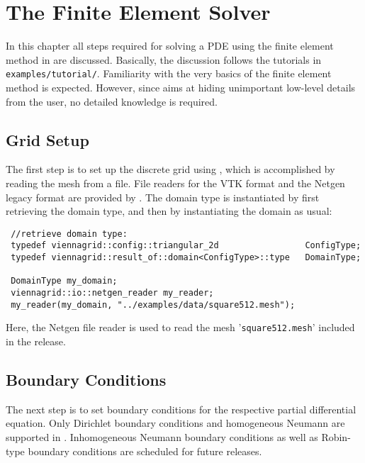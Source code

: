 
\chapter{The Finite Element Solver}  \label{chap:fem}

In this chapter all steps required for solving a PDE using the finite element method in {\ViennaFEM} are discussed.
Basically, the discussion follows the tutorials in \lstinline|examples/tutorial/|.
Familiarity with the very basics of the finite element method is expected. However, since {\ViennaFEM} aims at hiding unimportant low-level details from the
user, no detailed knowledge is required.

\section{Grid Setup}
The first step is to set up the discrete grid using {\ViennaGrid},
which is accomplished by reading the mesh from a file.
File readers for the VTK format \cite{VTK,VTKfileformat} and the Netgen legacy format \cite{netgen} are provided by {\ViennaGrid}.
The domain type is instantiated by first retrieving the domain type, and then by instantiating the domain as usual:
\begin{lstlisting}
 //retrieve domain type:
 typedef viennagrid::config::triangular_2d                 ConfigType;
 typedef viennagrid::result_of::domain<ConfigType>::type   DomainType;

 DomainType my_domain;
 viennagrid::io::netgen_reader my_reader;
 my_reader(my_domain, "../examples/data/square512.mesh");
\end{lstlisting}
Here, the Netgen file reader is used to read the mesh '\texttt{square512.mesh}' included in the {\ViennaFEM} release.



\section{Boundary Conditions}
The next step is to set boundary conditions for the respective partial differential equation.
Only Dirichlet boundary conditions and homogeneous Neumann are supported in {\ViennaFEMversion}.
Inhomogeneous Neumann boundary conditions as well as Robin-type boundary conditions are scheduled for future releases.

